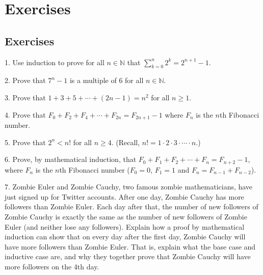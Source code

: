 \documentclass[10pt,]{book}
\theoremstyle{plain}
\theoremstyle{definition}
\numberwithin{equation}{chapter}
\def\d{\displaystyle}
\def\N{\mathbb N}
\newcommand{\lt}{ < }
\begin{document}
\typeout{************************************************}
\typeout{************************************************}
\section[Exercises]{Exercises}\label{section-16}
\typeout{************************************************}
\typeout{************************************************}
\subsection[Exercises]{Exercises}\label{exercises_seq-induction}
\begin{exerciselist}
\item[1.]\hypertarget{exercise-184}{}
          Use induction to prove for all \(n \in \N\) that \(\d\sum_{k=0}^n 2^k = 2^{n+1} - 1\).
\par\smallskip
\item[2.]\hypertarget{exercise-185}{}
          Prove that \(7^n - 1\) is a multiple of 6 for all \(n \in \N\).
\par\smallskip
\item[3.]\hypertarget{exercise-186}{}
          Prove that \(1 + 3 + 5 + \cdots + (2n-1) = n^2\) for all \(n \ge 1\).
\par\smallskip
\item[4.]\hypertarget{exercise-187}{}
          Prove that \(F_0 + F_2 + F_4 + \cdots + F_{2n} = F_{2n+1} - 1\) where \(F_n\) is the \(n\)th Fibonacci number.
\par\smallskip
\item[5.]\hypertarget{exercise-188}{}
          Prove that \(2^n \lt  n!\) for all \(n \ge 4\). (Recall, \(n! = 1\cdot 2 \cdot 3 \cdot \cdots\cdot n\).)
\par\smallskip
\item[6.]\hypertarget{exercise-189}{}
          Prove, by mathematical induction, that \(F_0 + F_1 + F_2 + \cdots + F_{n} = F_{n+2} - 1\), where \(F_n\) is the \(n\)th Fibonacci number (\(F_0 = 0\), \(F_1 = 1\) and \(F_n = F_{n-1} + F_{n-2}\)).
\par\smallskip
\item[7.]\hypertarget{exercise-190}{}
                Zombie Euler and Zombie Cauchy, two famous zombie mathematicians, have just signed up for Twitter accounts. After one day, Zombie Cauchy has more followers than Zombie Euler. Each day after that, the number of new followers of Zombie Cauchy is exactly the same as the number of new followers of Zombie Euler (and neither lose any followers). Explain how a proof by mathematical induction can show that on every day after the first day, Zombie Cauchy will have more followers than Zombie Euler. That is, explain what the base case and inductive case are, and why they together prove that Zombie Cauchy will have more followers on the 4th day.

\end{exerciselist}
\end{document}
